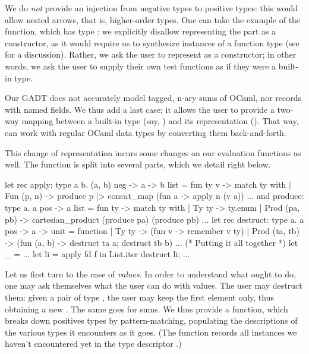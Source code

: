 We do \emph{not} provide an injection from negative types to positive types:
this would allow nested arrows, that is, higher-order types.  One can take the
example of the  function, which has type : we explicitly disallow
representing the  part as a
 constructor, as it would require us to synthesize instances of a
function type (see  for a discussion).
Rather, we ask the user to represent  as a  constructor;
in other words, we ask the user to supply their own test functions as if they
were a built-in type.

Our GADT does not accurately model tagged, n-ary sums of OCaml, nor records with
named fields. We thus add a last  case; it allows the user to
provide a two-way mapping between a built-in type (say, ) and
its \arti representation (). That way, \arti can work with regular
OCaml data types by converting them back-and-forth.

This change of representation incurs some changes on our evaluation functions
as well. The  function is split into several parts, which we detail
right below.
%
\begin{ocamlcode}
let rec apply: type a b. (a, b) neg -> a -> b list =
  fun ty v -> match ty with
  | Fun (p, n) ->
      produce p |> concat_map (fun a -> apply n (v a))
  ...
and produce: type a. a pos -> a list =
  fun ty -> match ty with
  | Ty ty -> ty.enum
  | Prod (pa, pb) ->
      cartesian_product (produce pa) (produce pb)
  ...
let rec destruct: type a. a pos -> a -> unit =
  function
  | Ty ty -> (fun v -> remember v ty)
  | Prod (ta, tb) -> (fun (a, b) ->
      destruct ta a; destruct tb b)
  ...
(* Putting it all together *)
let _ = ...
  let li = apply fd f in
  List.iter destruct li; ...
\end{ocamlcode}
%
Let us first turn to the case of \emph{values}. In order to understand what \arti
ought to do, one may ask themselves what the user can do with values. The user
may destruct them: given a pair of type , the user may keep
the first element only, thus obtaining a new . The same goes for sums. We
thus provide a  function, which breaks down positives types by
pattern-matching, populating the descriptions of the various types it encounters
as it goes. (The  function records all instances we haven't
encountered yet in the type descriptor .)

